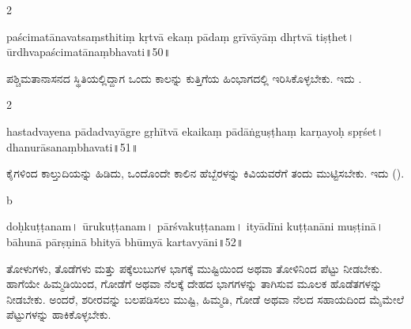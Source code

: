 \begin{paracol}{2}
\vfill
\begin{sans}
paścimatānavatsaṃsthitiṃ kṛtvā ekaṃ pādaṃ grīvāyāṃ dhṛtvā tiṣṭhet\!। ūrdhvapaścimatānaṃ\break bhavati\!॥50\!॥
\end{sans}
\vskip 0.5cm

{ಪಶ್ಚಿಮತಾನಾಸನದ ಸ್ಥಿತಿಯಲ್ಲಿದ್ದಾಗ ಒಂದು ಕಾಲನ್ನು ಕುತ್ತಿಗೆಯ ಹಿಂಭಾಗದಲ್ಲಿ ಇರಿಸಿಕೊಳ್ಳಬೇಕು. ಇದು .}
\vfill
\switchcolumn
{}

\end{paracol}

\newpage

\begin{paracol}{2}

\vskip 0.5cm

\begin{sans}
hastadvayena pādadvayāgre gṛhītvā ekaikaṃ pādāṅguṣṭhaṃ karṇayoḥ spṛśet\!। dhanurāsanaṃ\break bhavati\endnote{bhavati~] \textit{conj.}, \textit{omitted.} M.}\!॥51\!॥
\end{sans}
\vskip 0.5cm

{ಕೈಗಳಿಂದ ಕಾಲ್ತುದಿಯನ್ನು ಹಿಡಿದು, ಒಂದೊಂದೇ ಕಾಲಿನ ಹೆಬ್ಬೆರಳನ್ನು ಕಿವಿಯವರೆಗೆ ತಂದು ಮುಟ್ಟಿಸಬೇಕು. ಇದು  ().}
\switchcolumn
\begin{fullpagebox}{\textheight}{b}{\columnwidth}%
\begin{sans}
doḥkuṭṭanam\!। ūrukuṭṭanam\!। pārśvakuṭṭanam\!। ityādīni kuṭṭanāni muṣṭinā\!। bāhunā pārṣṇinā bhityā bhūmyā kartavyāni\!॥52\!॥
\end{sans}
\vskip 0.5cm

{ತೋಳುಗಳು, ತೊಡೆಗಳು ಮತ್ತು ಪಕ್ಕೆಲುಬುಗಳ ಭಾಗಕ್ಕೆ ಮುಷ್ಟಿಯಿಂದ ಅಥವಾ ತೋಳಿನಿಂದ ಪೆಟ್ಟು ನೀಡಬೇಕು. ಹಾಗೆಯೇ ಹಿಮ್ಮಡಿಯಿಂದ, ಗೋಡೆಗೆ ಅಥವಾ ನೆಲಕ್ಕೆ ದೇಹದ ಭಾಗಗಳನ್ನು ತಾಗಿಸುವ ಮೂಲಕ ಹೊಡೆತಗಳನ್ನು ನೀಡಬೇಕು. ಅಂದರೆ, ಶರೀರವನ್ನು ಬಲಪಡಿಸಲು ಮುಷ್ಟಿ, ಹಿಮ್ಮಡಿ, ಗೋಡೆ ಅಥವಾ ನೆಲದ ಸಹಾಯದಿಂದ ಮೈಮೇಲೆ ಪೆಟ್ಟುಗಳನ್ನು ಹಾಕಿಕೊಳ್ಳಬೇಕು.}
\vskip 0.5cm

\end{fullpagebox}
\end{paracol}

